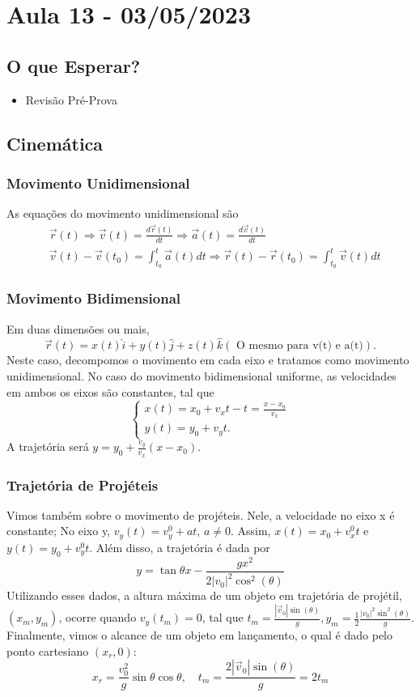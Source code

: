 \documentclass[physics_notes.tex]{subfiles}
\begin{document}
\section{Aula 13 - 03/05/2023}
\subsection{O que Esperar?}
\begin{itemize}
	\item Revisão Pré-Prova
\end{itemize}
\subsection{Cinemática}
\subsubsection{Movimento Unidimensional}
As equações do movimento unidimensional são
\begin{align*}
	 & \vec{r}(t)\Rightarrow \vec{v}(t)=\frac{d \vec{r}(t)}{dt} \Rightarrow \vec{a}(t) = \frac{d \vec{v}(t)}{dt}                         \\
	 & \vec{v}(t)-\vec{v}(t_{0}) = \int_{t_{0}}^{t} \vec{a}(t)dt \Rightarrow \vec{r}(t) - \vec{r}(t_{0}) = \int_{t_{0}}^{t} \vec{v}(t)dt
\end{align*}
\subsubsection{Movimento Bidimensional}
Em duas dimensões ou mais,
$$
	\vec{r}(t) = x(t)\hat{i} + y(t)\hat{j} + z(t)\hat{k} (\text{ O mesmo para v(t) e a(t)}).
$$
Neste caso, decompomos o movimento em cada eixo e tratamos como movimento unidimensional. No caso do movimento bidimensional uniforme,
as velocidades em ambos os eixos são constantes, tal que
$$
	\left\{\begin{array}{ll}
		x(t) = x_{0} + v_{x}t - t = \frac{x-x_{0}}{v_{x}} \\
		y(t) = y_{0} + v_{y}t.
	\end{array}\right.
$$
A trajetória será $y=y_{0} + \frac{v_{y}}{v_{x}}(x-x_{0}).$
\subsubsection{Trajetória de Projéteis}
Vimos também sobre o movimento de projéteis. Nele, a velocidade no eixo x é constante; No eixo y, $v_{y}(t) = v_{y}^{0} + at$,
$a\neq0$. Assim, $x(t) = x_{0} + v_{x}^{0}t$ e $y(t) = y_{0} + v_{y}^{0}t$. Além disso, a trajetória é dada por
$$
	y = \tan{\theta }x - \frac{gx^{2}}{2|v_{0}|^{2}\cos^{2}{(\theta )}}
$$
Utilizando esses dados, a altura máxima de um objeto em trajetória de projétil, $(x_{m}, y_{m})$, ocorre quando
$v_{y}(t_{m}) = 0$, tal que $t_{m}=\frac{|\vec{v}_{0}|\sin{(\theta )}}{g}, y_{m}=\frac{1}{2}\frac{|v_{0}|^{2}\sin^{2}{(\theta )}}{g}.$
Finalmente, vimos o alcance de um objeto em lançamento, o qual é dado pelo ponto cartesiano $(x_{r}, 0)$:
$$
	x_{r} = \frac{v_{0}^{2}}{g}\sin{\theta }\cos{\theta },\quad t_{m} = \frac{2|\vec{v}_{0}|\sin{(\theta)}}{g} = 2t_{m}
$$
\end{document}
